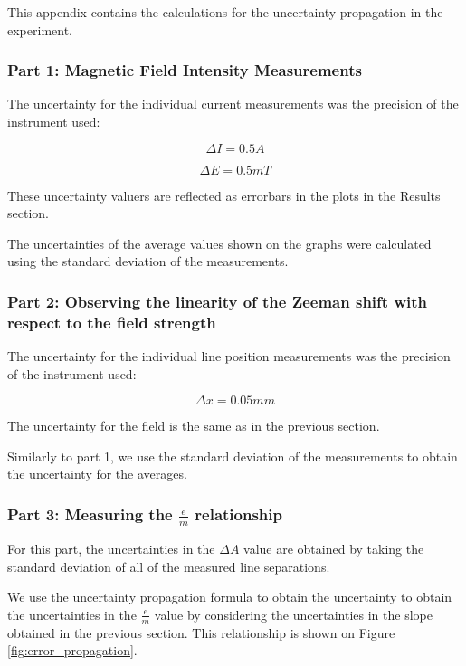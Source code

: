This appendix contains the calculations for the uncertainty propagation in the experiment.

\subsubsection{Part 1: Magnetic Field Intensity Measurements}

The uncertainty for the individual current measurements was the precision of the instrument used:

\begin{equation}
    \Delta I = 0.5 A
\end{equation}

\begin{equation}
    \Delta E = 0.5 mT
\end{equation}

These uncertainty valuers are reflected as errorbars in the plots in the Results section.

The uncertainties of the average values shown on the graphs were calculated using the standard deviation of the measurements.

\subsubsection{Part 2: Observing the linearity of the Zeeman shift with respect to the field strength}

The uncertainty for the individual line position measurements was the precision of the instrument used:

\begin{equation}
    \Delta x = 0.05 mm
\end{equation}

The uncertainty for the field is the same as in the previous section.

Similarly to part 1, we use the standard deviation of the measurements to obtain the uncertainty for the averages.

\subsubsection{Part 3: Measuring the $\frac{e}{m}$ relationship}


For this part, the uncertainties in the $\Delta A$ value are obtained by taking the standard deviation of all of the measured line separations.

We use the uncertainty propagation formula to obtain the uncertainty to obtain the uncertainties in the $\frac{e}{m}$ value by considering the uncertainties in the slope obtained in the previous section.
This relationship is shown on Figure \ref{fig:error_propagation}.

